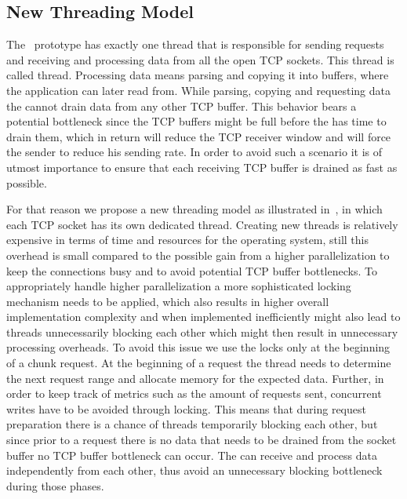 \subsection{New Threading Model}
\label{sec:threading-model}

The \protoold~prototype has exactly one thread that is responsible for sending requests and receiving and processing data from all the open TCP sockets. 
This thread is called  thread. 
Processing data means parsing and copying it into buffers, where the application can later read from. 
While parsing, copying and requesting data the  cannot drain data from any other TCP buffer. 
This behavior bears a potential bottleneck since the TCP buffers might be full before the  has time to drain them, which in return will reduce the TCP receiver window and will force the sender to reduce his sending rate. 
In order to avoid such a scenario it is of utmost importance to ensure that each receiving TCP buffer is drained as fast as possible. 

For that reason we propose a new threading model as illustrated in~, in which each TCP socket has its own dedicated  thread. 
Creating new threads is relatively expensive in terms of time and resources for the operating system, still this overhead is small compared to the possible gain from a higher parallelization to keep the connections busy and to avoid potential TCP buffer bottlenecks.
To appropriately handle higher parallelization a more sophisticated locking mechanism needs to be applied, which also results in higher overall implementation complexity and when implemented inefficiently might also lead to threads unnecessarily blocking each other which might then result in unnecessary processing overheads. 
To avoid this issue we use the locks only at the beginning of a chunk request. 
At the beginning of a request the thread needs to determine the next request range and allocate memory for the expected data. 
Further, in order to keep track of metrics such as the amount of requests sent, concurrent writes have to be avoided through locking. 
This means that during request preparation there is a chance of threads temporarily blocking each other, but since prior to a request there is no data that needs to be drained from the socket buffer no TCP buffer bottleneck can occur. 
The  can receive and process data independently from each other, thus avoid an unnecessary blocking bottleneck during those phases. 

